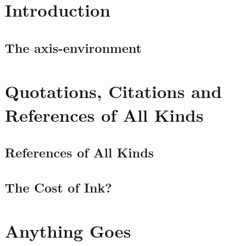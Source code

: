 \documentclass[%
twoside,symmetric,	%
nols, %
a4paper, %
notoc,	%
justified,	%
nobib, %
]{tufte-book} %
\begin{document}
	
	
	
	
	
	
	\sffamily %
	\tableofcontents
	\normalfont %
	\cleardoublepage
	
	\pagestyle{mystyle}	
	\setcounter{page}{1}
	
	\chapter{Introduction}\label{sec:introduction}
		
		\section{The axis-environment}
			

	\chapter[Quotes \& References]{Quotations, Citations and \\ References of All Kinds}
		
		\section[References]{References of All Kinds}
		
		\section[The Cost of Ink?]{The Cost of Ink?}
			
	\chapter[Anything Goes]{Anything Goes}
		
			
	
	\cleardoublepage %
	
	
	
\end{document}
